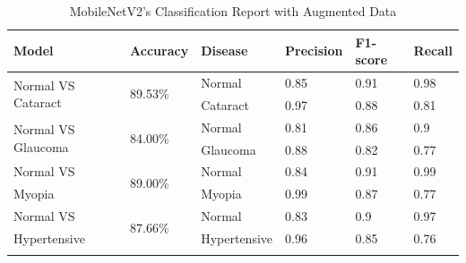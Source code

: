 \begin{table}[H]
\caption{MobileNetV2's Classification Report with Augmented Data}
\centering
\begin{tabular}{|l|l|l|l|l|l|} 
\hline
Model                               & Accuracy                 & Disease              & Precision            & F1-score             & Recall                \\ 
\hline
\multirow{2}{*}{Normal VS Cataract} & \multirow{2}{*}{89.53\%} & Normal               & 0.85                 & 0.91                 & 0.98                  \\ 
\cline{3-6}
                                    &                          & Cataract             & 0.97                 & 0.88                 & 0.81                  \\ 
\hline
\multirow{2}{*}{Normal VS Glaucoma} & \multirow{2}{*}{84.00\%} & Normal               & 0.81                 & 0.86                 & 0.9                   \\ 
\cline{3-6}
                                    &                          & Glaucoma             & 0.88                 & 0.82                 & 0.77                  \\ 
\hline
Normal VS                           & \multirow{2}{*}{89.00\%} & Normal               & 0.84                 & 0.91                 & 0.99                  \\ 
\cline{3-6}
Myopia                              &                          & Myopia               & 0.99                 & 0.87                 & 0.77                  \\ 
\hline
Normal VS                           & \multirow{2}{*}{87.66\%} & Normal               & 0.83                 & 0.9                  & 0.97                  \\ 
\cline{3-6}
Hypertensive                        &                          & Hypertensive         & 0.96                 & 0.85                 & 0.76                  \\ 
\hline
\multicolumn{1}{l}{}                & \multicolumn{1}{l}{}     & \multicolumn{1}{l}{} & \multicolumn{1}{l}{} & \multicolumn{1}{l}{} & \multicolumn{1}{l}{} 
\end{tabular}
\end{table}
